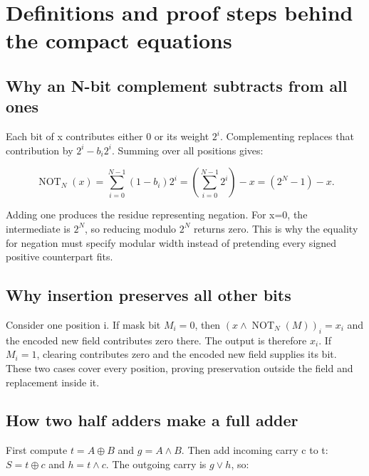\section{Definitions and proof steps behind the compact equations}\label{03-visual-computing-i-ch018-definitions-and-proof-steps-behind-the-compact-equations}

\subsection{Why an N-bit complement subtracts from all ones}\label{03-visual-computing-i-ch018-why-an-n-bit-complement-subtracts-from-all-ones}

Each bit of x contributes either 0 or its weight \(2^i\). Complementing replaces that contribution by \(2^i-b_i2^i\). Summing over all positions gives:

\[
\operatorname{NOT}_N(x)=\sum_{i=0}^{N-1}(1-b_i)2^i
=\left(\sum_{i=0}^{N-1}2^i\right)-x=(2^N-1)-x.
\]

Adding one produces the residue representing negation. For x=0, the intermediate is \(2^N\), so reducing modulo \(2^N\) returns zero. This is why the equality for negation must specify modular width instead of pretending every signed positive counterpart fits.

\subsection{Why insertion preserves all other bits}\label{03-visual-computing-i-ch018-why-insertion-preserves-all-other-bits}

Consider one position i. If mask bit \(M_i=0\), then \((x\land\operatorname{NOT}_N(M))_i=x_i\) and the encoded new field contributes zero there. The output is therefore \(x_i\). If \(M_i=1\), clearing contributes zero and the encoded new field supplies its bit. These two cases cover every position, proving preservation outside the field and replacement inside it.

\subsection{How two half adders make a full adder}\label{03-visual-computing-i-ch018-how-two-half-adders-make-a-full-adder}

First compute \(t=A\oplus B\) and \(g=A\land B\). Then add incoming carry c to t: \(S=t\oplus c\) and \(h=t\land c\). The outgoing carry is \(g\lor h\), so:

